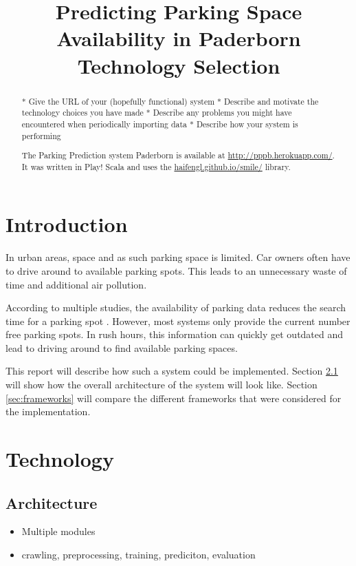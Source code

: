 



\title{Predicting Parking Space Availability in Paderborn\\
Technology Selection}
\maketitle

\begin{abstract}
 * Give the URL of your (hopefully functional) system
 * Describe and motivate the technology choices you have made
 * Describe any problems you might have encountered when periodically importing data
 * Describe how your system is performing

The Parking Prediction system Paderborn is available at \url{http://pppb.herokuapp.com/}. It was written in Play! Scala and uses the \href{smile}{haifengl.github.io/smile/} library.
 \end{abstract}

\section{Introduction}

In urban areas, space and as such parking space is limited. Car owners often have to drive around to available parking spots. This leads to an unnecessary waste of time and additional air pollution. 

According to multiple studies, the availability of parking data reduces the search time for a parking spot \cite{Asakura1994}\cite{Caicedo2010228}. However, most systems only provide the current number free parking spots. In rush hours, this information can quickly get outdated and lead to driving around to find available parking spaces.

This report will describe how such a system could be implemented. Section \ref{sec:architecture} will show how the overall architecture of the system will look like. Section \ref{sec:frameworks} will compare the different frameworks that were considered for the implementation. 

\section{Technology}

\subsection{Architecture}\label{sec:architecture}
\begin{itemize}
  \item Multiple modules
  \item crawling, preprocessing, training, prediciton, evaluation
\end{itemize}

